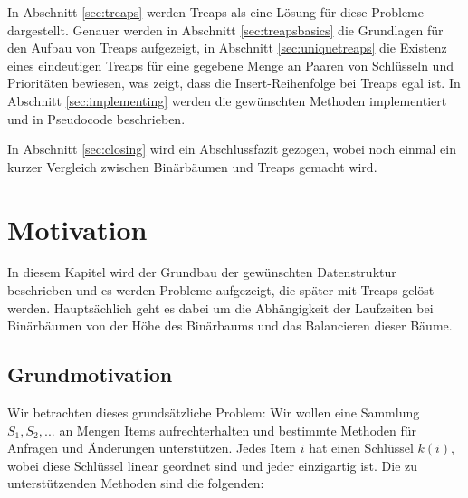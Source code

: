 \documentclass[a4paper]{scrreprt}
\theoremstyle{definition}
\begin{document}
In Abschnitt \ref{sec:treaps} werden Treaps als eine Lösung für diese Probleme dargestellt.
Genauer werden in Abschnitt \ref{sec:treapsbasics} die Grundlagen für den Aufbau von Treaps aufgezeigt, in Abschnitt \ref{sec:uniquetreaps} die Existenz eines eindeutigen Treaps für eine gegebene Menge an Paaren von Schlüsseln und Prioritäten bewiesen, was zeigt, dass die Insert-Reihenfolge bei Treaps egal ist. In Abschnitt \ref{sec:implementing} werden die gewünschten Methoden implementiert und in Pseudocode beschrieben.


In Abschnitt \ref{sec:closing} wird ein Abschlussfazit gezogen, wobei noch einmal ein kurzer Vergleich zwischen Binärbäumen und Treaps gemacht wird. %

\chapter{Motivation}
\label{sec:motivation}

In diesem Kapitel wird der Grundbau der gewünschten Datenstruktur beschrieben und es werden Probleme aufgezeigt, die später mit Treaps gelöst werden.
Hauptsächlich geht es dabei um die Abhängigkeit der Laufzeiten bei Binärbäumen von der Höhe des Binärbaums und das Balancieren dieser Bäume.

\section{Grundmotivation}
\label{sec:motivationbasics}

Wir betrachten dieses grundsätzliche Problem:
Wir wollen eine Sammlung ${S_1, S_2, ...}$ an Mengen Items aufrechterhalten und bestimmte Methoden für Anfragen und Änderungen unterstützen. %
Jedes Item $i$ hat einen Schlüssel $k(i)$, wobei diese Schlüssel linear geordnet sind und jeder einzigartig ist. %
Die zu unterstützenden Methoden sind die folgenden:
\end{document}
